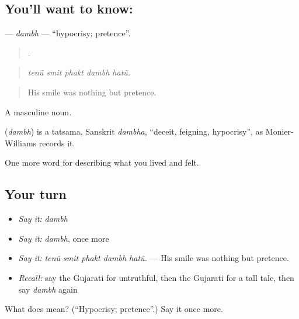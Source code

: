\subsection*{You'll want to know: }
\textbf{} — \emph{dambh} — \textquotedblleft{}hypocrisy; pretence\textquotedblright{}.

\begin{quote}
    .
\end{quote}

\begin{quote}
\emph{tenũ smit phakt dambh hatũ.}
\end{quote}

\begin{quote}
His smile was nothing but pretence.
\end{quote}

A masculine noun.

\begin{cousinweb}
\textbf{} (\emph{dambh}) is a tatsama, Sanskrit \emph{dambha}, \textquotedblleft{}deceit, feigning, hypocrisy\textquotedblright{}, as Monier-Williams records it.
\end{cousinweb}

\begin{grammarlens}[title={What you've built}]
One more word for describing what you lived and felt.
\end{grammarlens}

\subsection*{Your turn}
\begin{itemize}
\raggedright
  \item \emph{Say it:} \emph{dambh}
  \item \emph{Say it:} \emph{dambh}, once more
  \item \emph{Say it:} \emph{tenũ smit phakt dambh hatũ.} — His smile was nothing but pretence.
  \item \emph{Recall:} say the Gujarati for untruthful, then the Gujarati for a tall tale, then say \emph{dambh} again
\end{itemize}

\begin{tcolorbox}[breakable,colback=teal!4,colframe=teal!35!black,title={Before you move on}]
What does  mean? (\textquotedblleft{}Hypocrisy; pretence\textquotedblright{}.) Say it once more.
\end{tcolorbox}

